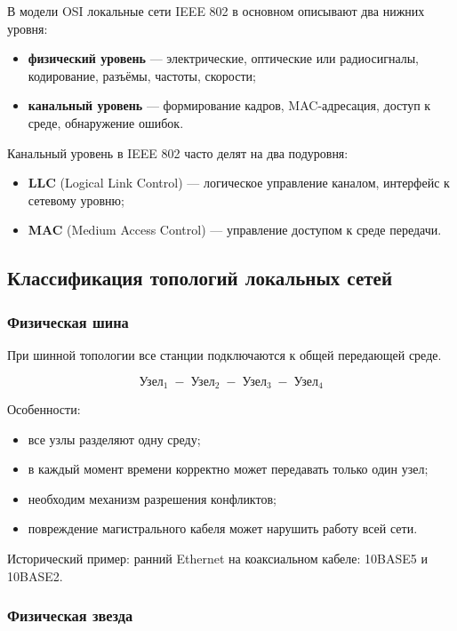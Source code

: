 \documentclass[12pt,a4paper]{article}
\begin{document}
В модели OSI локальные сети IEEE 802 в основном описывают два нижних уровня:
\begin{itemize}
    \item \textbf{физический уровень} --- электрические, оптические или радиосигналы, кодирование, разъёмы, частоты, скорости;
    \item \textbf{канальный уровень} --- формирование кадров, MAC-адресация, доступ к среде, обнаружение ошибок.
\end{itemize}

Канальный уровень в IEEE 802 часто делят на два подуровня:
\begin{itemize}
    \item \textbf{LLC} (Logical Link Control) --- логическое управление каналом, интерфейс к сетевому уровню;
    \item \textbf{MAC} (Medium Access Control) --- управление доступом к среде передачи.
\end{itemize}

\subsection{Классификация топологий локальных сетей}

\subsubsection{Физическая шина}

При шинной топологии все станции подключаются к общей передающей среде.

\[
\text{Узел}_1 \;-\; \text{Узел}_2 \;-\; \text{Узел}_3 \;-\; \text{Узел}_4
\]

Особенности:
\begin{itemize}
    \item все узлы разделяют одну среду;
    \item в каждый момент времени корректно может передавать только один узел;
    \item необходим механизм разрешения конфликтов;
    \item повреждение магистрального кабеля может нарушить работу всей сети.
\end{itemize}

Исторический пример: ранний Ethernet на коаксиальном кабеле: 10BASE5 и 10BASE2.

\subsubsection{Физическая звезда}
\end{document}
